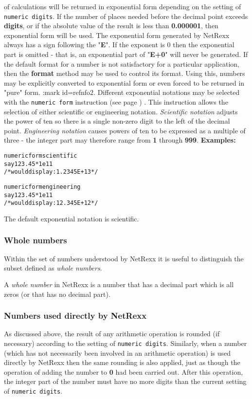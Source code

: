 of calculations will be returned in exponential form depending on the
setting of \texttt{numeric digits}.
If the number of places needed before the decimal point
exceeds \textbf{digits}, or if the absolute value of the result is
less than \textbf{0.000001}, then exponential form will be used.
The exponential form generated by NetRexx always has a sign following the
"\textbf{E}".
If the exponent is 0 then the exponential part is omitted - that
is, an exponential part of "\textbf{E+0}" will never be
generated.
 If the default format for a number is not satisfactory for a
particular application, then the \textbf{format} method may be used to
control its format.  Using this, numbers may be explicitly converted to
exponential form or even forced to be returned in "pure" form.
:mark id=refnfo2.
 Different exponential notations may be selected with the
 \texttt{numeric form} instruction (see page \pageref{refnform}) .
This instruction allows the selection of either scientific or
engineering notation.
\emph{Scientific notation} adjusts the power of ten so there is a
single non-zero digit to the left of the decimal point.
\emph{Engineering notation} causes powers of ten to be expressed as a
multiple of three - the integer part may therefore range
from \textbf{1} through \textbf{999}.
 \textbf{Examples:}
\begin{alltt}
numeric form scientific
say 123.45 * 1e11
/* would display: 1.2345E+13 */

numeric form engineering
say 123.45  * 1e11
/* would display: 12.345E+12 */
\end{alltt}
 The default exponential notation is scientific.
\subsubsection{Whole numbers}\label{"id"}
 Within the set of numbers understood by NetRexx it is useful to
distinguish the subset defined as \emph{whole numbers}.
 
A \emph{whole number} in NetRexx is a number that has a decimal part
which is all zeros (or that has no decimal part).
\subsubsection{Numbers used directly by NetRexx}\label{"id"}
 As discussed above, the result of any arithmetic operation is
rounded (if necessary) according to the setting of \texttt{numeric digits}.
Similarly, when a number (which has not necessarily been involved in an
arithmetic operation) is used directly by NetRexx then the same rounding
is also applied, just as though the operation of adding the number
to \textbf{0} had been carried out.
After this operation, the integer part of the number must have no more
digits than the current setting of \texttt{numeric digits}.
 
